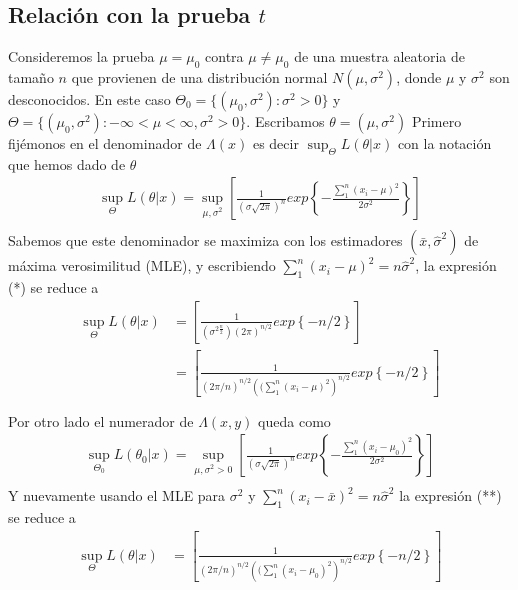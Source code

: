 \documentclass[peerreview]{IEEEtran}
\begin{document}
\subsection{ Relación con la prueba $t$}
Consideremos la prueba $\mu = \mu_0$ contra $\mu \ne \mu_0$ de una muestra aleatoria de tamaño $n$ que provienen de una distribución normal $N(\mu,\sigma^2)$, donde $\mu$ y $\sigma^2$ son desconocidos. En este caso $\Theta_0 = \{(\mu_0,\sigma^2):\sigma^2>0\}$ y $\Theta =\{(\mu_0,\sigma^2):- \infty < \mu < \infty,\sigma^2>0\}$. Escribamos $\theta=(\mu, \sigma^2)$
Primero fijémonos en el denominador de $\Lambda(x)$ es decir $\sup_\Theta L(\theta | x)$ con la notación que hemos dado de $\theta$
\begin{equation} \tag{*}
\begin{split}
\sup_\Theta L(\theta | x) = \sup_{\mu, \sigma^2} \left[ \frac{1}{(\sigma\sqrt{2\pi})^n} exp\left\{  -\frac{\sum_1^n(x_i-\mu)^2}{2\sigma^2} \right\}  \right] \\
\end{split}
\end{equation}
 Sabemos que este denominador se maximiza con los estimadores $(\bar{x},\hat{\sigma}^2)$ de máxima verosimilitud (MLE), y escribiendo $\sum_1^n(x_i-\mu)^2 = n\hat{\sigma}^2$, la expresión (*) se reduce a   
\begin{equation*}
\begin{split}
\sup_\Theta L(\theta | x) & = \left[ \frac{1}{ (\sigma^{2 \frac{n}{2}} ) (2\pi)^{n/2}} exp \left\{  -n/2 \right\} \right] \\
& = \left[ \frac{1}{ (2\pi/n)^{n/2} \left( (\sum_1^n(x_i -\mu)^2\right)^{ n/2} } exp \left\{  -n/2 \right\} \right] \\
\\\end{split}
\end{equation*}
Por otro lado el numerador de $\Lambda(x,y)$ queda como 
\begin{equation}\tag{**} 
\begin{split} 
\sup_{\Theta_0} L(\theta_0 | x) = \sup_{\mu, \sigma^2>0} \left[ \frac{1}{(\sigma\sqrt{2\pi})^n} exp\left\{  -\frac{\sum_1^n(x_i-\mu_0)^2}{2\sigma^2} \right\}  \right] \\
\end{split}
\end{equation}
Y nuevamente usando el MLE para $\sigma^2$ y  $\sum_1^n(x_i-\bar{x})^2 = n\hat{\sigma}^2$ la expresión (**) se reduce a 
\begin{equation*}
\begin{split}
\sup_\Theta L(\theta | x)
& = \left[ \frac{1}{ (2\pi/n)^{n/2} \left( (\sum_1^n(x_i -\mu_0)^2\right)^{ n/2} } exp \left\{  -n/2 \right\} \right] \\
\\\end{split}
\end{equation*}
\end{document}
